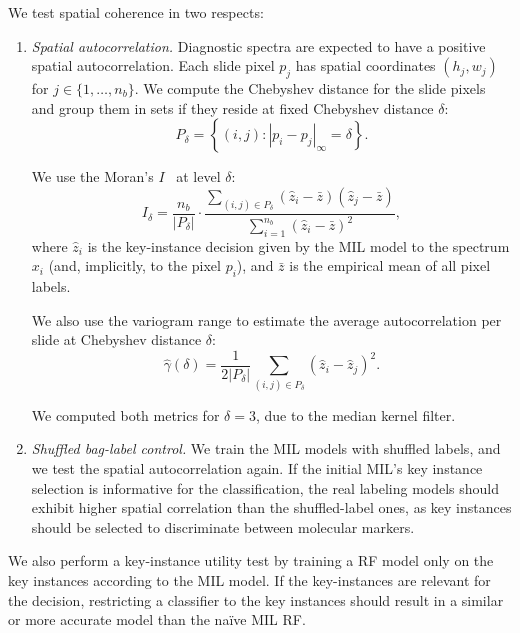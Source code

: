 \documentclass[12pt]{article}
\theoremstyle{paper}
\begin{document}
We test spatial coherence in two respects: 
\begin{enumerate}[label=(\roman*)]
    \item \textit{Spatial autocorrelation.} Diagnostic spectra are expected to have a positive spatial autocorrelation. Each slide pixel $p_j$ has spatial coordinates $(h_j, w_j)$ for $j \in \{1, \ldots, n_b\}$. We compute the Chebyshev distance for the slide pixels and group them in sets if they reside at fixed Chebyshev distance $\delta$:  
    \begin{equation}
         P_{\delta}=\left\{(i, j): |p_i - p_j|_\infty = \delta\right\}.
    \end{equation} 
    
    We use the Moran's $I$~\cite{moran1950, rittel2026cohort} at level $\delta$:
    \begin{equation}
        I_{\delta}=\frac{n_b}{|P_{\delta}|}\cdot\frac{\sum_{(i,j)\in P_{\delta}}(\hat z_i-\bar z)(\hat z_j-\bar z)}{\sum_{i=1}^{n_b}(\hat z_i-\bar z)^2},
    \end{equation} where $\hat z_i$ is the key-instance decision given by the MIL model to the spectrum $x_i$ (and, implicitly, to the pixel $p_i$), and $\bar z$ is the empirical mean of all pixel labels.

    We also use the variogram range \cite{veronesi2025machine} to estimate the average autocorrelation per slide at Chebyshev distance $\delta$:
    \begin{equation}
        \hat\gamma(\delta)=\frac{1}{2|P_\delta|}\sum_{(i,j)\in P_\delta}(\hat z_i-\hat z_j)^2. 
    \end{equation} 

    We computed both metrics for $\delta=3$, due to the median kernel filter.
    
    \item \textit{Shuffled bag-label control.} We train the MIL models with shuffled labels, and we test the spatial autocorrelation again. If the initial MIL's key instance selection is informative for the classification, the real labeling models should exhibit higher spatial correlation than the shuffled-label ones, as key instances should be selected to discriminate between molecular markers.

\end{enumerate}
We also perform a key-instance utility test by training a RF model only on the key instances according to the MIL model. If the key-instances are relevant for the decision, restricting a classifier to the key instances should result in a similar or more accurate model than the naïve MIL RF.
\end{document}
